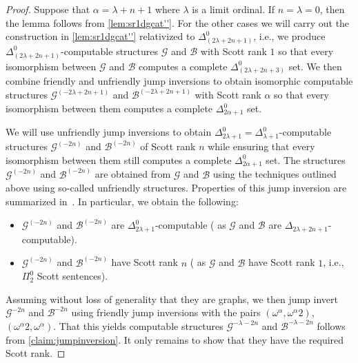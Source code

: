 \documentclass{amsart}
\newcommand{\G}{\mathcal{G}}
\newcommand\+[1]{\mathcal{#1}}
\renewcommand\*[1]{\mathbf{#1}}
\renewcommand\=[1]{\text{#1}}
\renewcommand\*[1]{\mathbf{#1}}
\newcommand{\B}{\mathcal{B}}
\begin{document}
 \begin{proof}
   Suppose that $\alpha=\lambda+n+1$ where $\lambda$ is a limit ordinal. If $n=\lambda=0$, then the lemma follows from \cref{lem:sr1dgcat''}. For the other cases we will carry out the construction in \cref{lem:sr1dgcat''} relativized to $\Delta^0_{(2\lambda+2n+1)}$, i.e., we produce $\Delta^0_{(2\lambda+2n+1)}$-computable structures $\+G$ and $\B$ with Scott rank $1$ so that every isomorphism between $\+G$ and $\B$ computes a complete $\Delta^0_{(2\lambda+2n+3)}$ set. We then combine friendly and unfriendly jump inversions to obtain isomorphic computable structures $\+G^{(-2\lambda+2n+1)}$ and $\B^{(-2\lambda+2n+1)}$ with Scott rank $\alpha$ so that every isomorphism between them computes a complete $\Delta^0_{2\alpha+1}$ set. 
 
   We will use unfriendly jump inversions to obtain $\Delta^0_{2\lambda+1}=\Delta^0_{\lambda+1}$-computable structures $\+G^{(-2n)}$ and $\B^{(-2n)}$ of Scott rank $n$ while ensuring that every isomorphism between them still computes a complete $\Delta^0_{2\alpha+1}$ set. The structures $\+G^{(-2n)}$ and $\B^{(-2n)}$ are obtained from $\+G$ and $\B$ using the techniques outlined above using so-called unfriendly structures. Properties of this jump inversion are summarized in~\cite[Theorem 4.3]{harrison-trainor2025}. In particular, we obtain the following:
   \begin{itemize}
   \item $\+G^{(-2n)}$ and $\B^{(-2n)}$ are $\Delta^0_{2\lambda+1}$-computable
     (\cite[Theorem 4.3 Item 1]{harrison-trainor2025} as $\G$ and $\B$ are $\Delta_{2\lambda+2n+1}$-computable).
   \item $\+G^{(-2n)}$ and $\B^{(-2n)}$ have Scott rank $n$
     (\cite[Theorem 4.3 Item 4]{harrison-trainor2025} as $\G$ and $\B$ have Scott rank $1$, i.e., $\Pi^0_2$ Scott sentences).
   \end{itemize}
   Assuming without loss of generality that they are graphs, we then jump invert $\+G^{-2n}$ and $\B^{-2n}$ using friendly jump inversions with the pairs $(\omega^\alpha,\omega^\alpha2)$, $(\omega^\alpha2,\omega^\alpha)$. That this yields computable structures $\+G^{-\lambda-2n}$ and $\+B^{-\lambda-2n}$ follows from \cref{claim:jumpinversion}. It only remains to show that they have the required Scott rank.


\end{proof}
\end{document}
